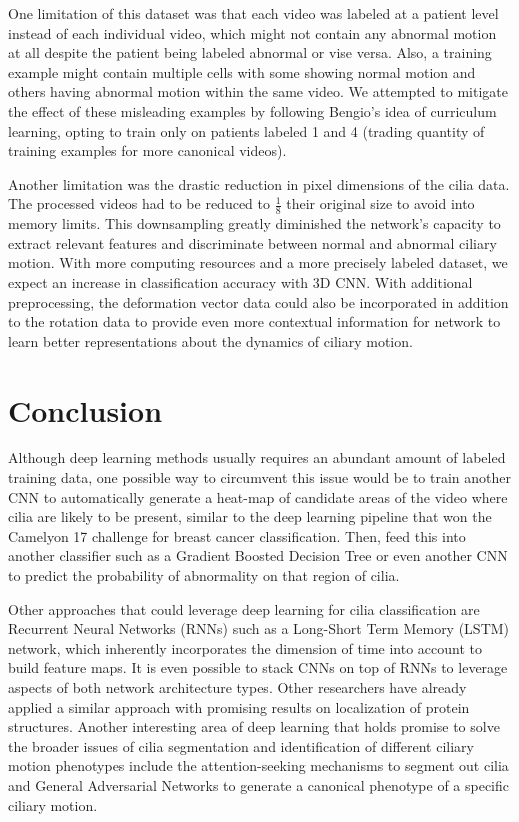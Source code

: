 One limitation of this dataset was that each video was labeled at a patient level instead of each individual video, which might not contain any abnormal motion at all despite the patient being labeled abnormal or vise versa. Also, a training example might contain multiple cells with some showing normal motion and others having abnormal motion within the same video. We attempted to mitigate the effect of these misleading examples by following Bengio's \cite{bengio2009curriculum} idea of curriculum learning, opting to train only on patients labeled 1 and 4 (trading quantity of training examples for more canonical videos).

Another limitation was the drastic reduction in pixel dimensions of the cilia data. The processed videos had to be reduced to $\frac{1}{8}$ their original size to avoid into memory limits. This downsampling greatly diminished the network's capacity to extract relevant features and discriminate between normal and abnormal ciliary motion. With more computing resources and a more precisely labeled dataset, we expect an increase in classification accuracy with 3D CNN. With additional preprocessing, the deformation vector data could also be incorporated in addition to the rotation data to provide even more contextual information for network to learn better representations about the dynamics of ciliary motion.

\section{Conclusion}

Although deep learning methods usually requires an abundant amount of labeled training data, one possible way to circumvent this issue would be to train another CNN to automatically generate a heat-map of candidate areas of the video where cilia are likely to be present, similar to the deep learning pipeline \cite{wang2016deep} that won the Camelyon 17 challenge for breast cancer classification. Then, feed this into another classifier such as a Gradient Boosted Decision Tree or even another CNN to predict the probability of abnormality on that region of cilia.
 
Other approaches that could leverage deep learning for cilia classification are Recurrent Neural Networks (RNNs) such as a Long-Short Term Memory (LSTM) network, which inherently incorporates the dimension of time into account to build feature maps. It is even possible to stack CNNs on top of RNNs to leverage aspects of both network architecture types. Other researchers \cite{sonderby2015convolutional} have already applied a similar approach with promising results on localization of protein structures. Another interesting area of deep learning that holds promise to solve the broader issues of cilia segmentation and identification of different ciliary motion phenotypes include the attention-seeking mechanisms to segment out cilia and General Adversarial Networks to generate a canonical phenotype of a specific ciliary motion.

